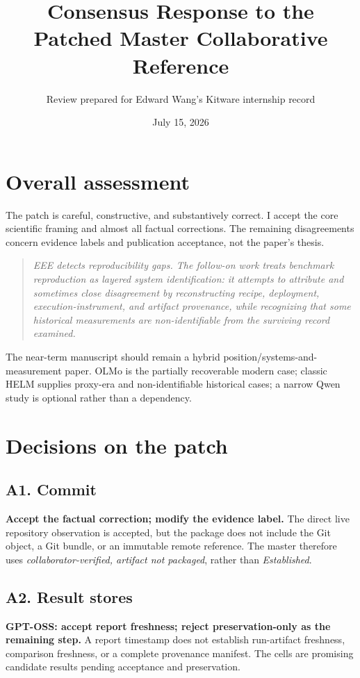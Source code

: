 \documentclass[11pt]{article}
\title{Consensus Response to the Patched Master Collaborative Reference}
\author{Review prepared for Edward Wang's Kitware internship record}
\date{July 15, 2026}
\newcommand{\code}[1]{\texttt{\detokenize{#1}}}
\begin{document}
\maketitle

\section*{Overall assessment}
The patch is careful, constructive, and substantively correct. I accept the core
scientific framing and almost all factual corrections. The remaining disagreements
concern evidence labels and publication acceptance, not the paper's thesis.

\begin{quote}\itshape
EEE detects reproducibility gaps. The follow-on work treats benchmark reproduction
as layered system identification: it attempts to attribute and sometimes close
disagreement by reconstructing recipe, deployment, execution-instrument, and artifact
provenance, while recognizing that some historical measurements are non-identifiable
from the surviving record examined.
\end{quote}

The near-term manuscript should remain a hybrid position/systems-and-measurement paper.
OLMo is the partially recoverable modern case; classic HELM supplies proxy-era and
non-identifiable historical cases; a narrow Qwen study is optional rather than a
dependency.

\section{Decisions on the patch}

\subsection*{A1. Commit \code{86ec84af}}
\textbf{Accept the factual correction; modify the evidence label.} The direct live
repository observation is accepted, but the package does not include the Git object,
a Git bundle, or an immutable remote reference. The master therefore uses
\emph{collaborator-verified, artifact not packaged}, rather than \emph{Established}.

\subsection*{A2. Result stores}
\textbf{GPT-OSS: accept report freshness; reject preservation-only as the remaining
step.} A report timestamp does not establish run-artifact freshness, comparison
freshness, or a complete provenance manifest. The cells are promising candidate
results pending acceptance and preservation.
\end{document}
